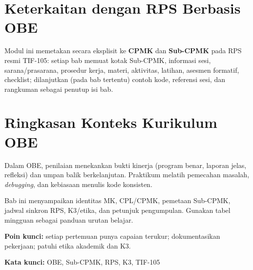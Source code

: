 \documentclass[../main.tex]{subfiles}
\begin{document}
\section{Keterkaitan dengan RPS Berbasis OBE}

Modul ini memetakan secara eksplisit ke \textbf{CPMK} dan \textbf{Sub-CPMK} pada RPS resmi TIF-105: setiap bab memuat kotak Sub-CPMK, informasi sesi, sarana/prasarana, prosedur kerja, materi, aktivitas, latihan, asesmen formatif, checklist; dilanjutkan (pada bab tertentu) contoh kode, referensi sesi, dan rangkuman sebagai penutup isi bab.

\section{Ringkasan Konteks Kurikulum OBE}

Dalam OBE, penilaian menekankan bukti kinerja (program benar, laporan jelas, refleksi) dan umpan balik berkelanjutan. Praktikum melatih pemecahan masalah, \textit{debugging}, dan kebiasaan menulis kode konsisten.

\begin{rangkuman}
Bab ini menyampaikan identitas MK, CPL/CPMK, pemetaan Sub-CPMK, jadwal sinkron RPS, K3/etika, dan petunjuk pengumpulan. Gunakan tabel mingguan sebagai panduan urutan belajar.

\textbf{Poin kunci:} setiap pertemuan punya capaian terukur; dokumentasikan pekerjaan; patuhi etika akademik dan K3.

\textbf{Kata kunci:} OBE, Sub-CPMK, RPS, K3, TIF-105
\end{rangkuman}
\end{document}
